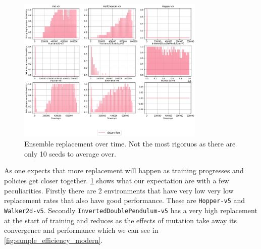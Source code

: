 \begin{figure}
    \centering
    \includegraphics[width=0.8\textwidth]{figures/dsunrise_policy_replacement_probability.png}
    \caption{Ensemble replacement over time. Not the most rigoruos as there are only 10 seeds to average over.}
    \label{fig:ensemble_replacement}
\end{figure}

As one expects that more replacement will happen as training progresses and policies get closer together. \ref{fig:ensemble_replacement} shows what our expectation are with a few peculiarities. Firstly there are 2 environments that have very low very low replacement rates that also have good performance. These are \texttt{Hopper-v5} and \texttt{Walker2d-v5}. Secondly \texttt{InvertedDoublePendulum-v5} has a very high replacement at the start of training and reduces as the effects of mutation take away its convergence and performance which we can see in \ref{fig:sample_efficiency_modern}.
